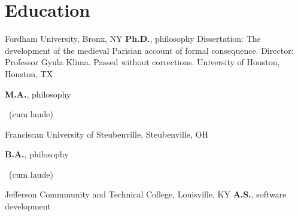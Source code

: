 \vspace*{0.4cm}
\section{Education}
	{%
		Fordham University, Bronx, NY}
	{%
		\textbf{Ph.D.}, philosophy}
	{%
	Dissertation: The development of the medieval Parisian account of formal consequence. Director: Professor Gyula Klima. Passed without corrections.}
		{
			University of Houston, Houston, TX}
		{
			\textbf{M.A.}, philosophy\begin{footnotesize}
				~(cum laude)
			\end{footnotesize}}
		{}
{
	Franciscan University of Steubenville, Steubenville, OH}
{
	\textbf{B.A.}, philosophy\begin{footnotesize}
		~(cum laude)
\end{footnotesize}}
{}
{%
	Jefferson Commmunity and Technical College, Louisville, KY}
{%
	\textbf{A.S.}, software development}
{}